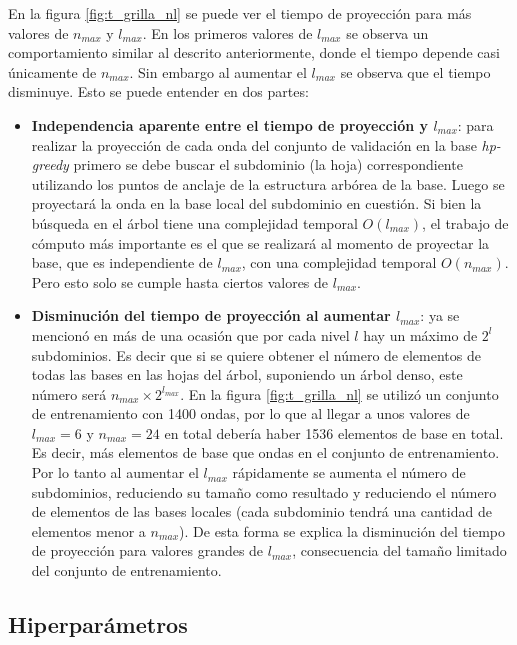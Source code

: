 En la figura \ref{fig:t_grilla_nl} se puede ver el tiempo de proyección para más valores de $n_{max}$ y $l_{max}$. En los primeros valores de $l_{max}$ se observa un comportamiento similar al descrito anteriormente, donde el tiempo depende casi únicamente de $n_{max}$. Sin embargo al aumentar el $l_{max}$ se observa que el tiempo disminuye. Esto se puede entender en dos partes:

\begin{itemize}
\item \textbf{Independencia aparente entre el tiempo de proyección y $l_{max}$}: para realizar la proyección de cada onda del conjunto de validación en la base \textit{hp-greedy} primero se debe buscar el subdominio (la hoja) correspondiente utilizando los puntos de anclaje de la estructura arbórea de la base. Luego se proyectará la onda en la base local del subdominio en cuestión. Si bien la búsqueda en el árbol tiene una complejidad temporal $O(l_{max})$, el trabajo de cómputo más importante es el que se realizará al momento de proyectar la base, que es independiente de $l_{max}$, con una complejidad temporal $O(n_{max})$. Pero esto solo se cumple hasta ciertos valores de $l_{max}$.
\item \textbf{Disminución del tiempo de proyección al aumentar $l_{max}$}: ya se mencionó en más de una ocasión que por cada nivel $l$ hay un máximo de $2^l$ subdominios. Es decir que si se quiere obtener el número de elementos de todas las bases en las hojas del árbol, suponiendo un árbol denso, este número será $n_{max} \times 2^{l_{max}}$. En la figura \ref{fig:t_grilla_nl} se utilizó un conjunto de entrenamiento con 1400 ondas, por lo que al llegar a unos valores de $l_{max} = 6$ y $n_{max} = 24$ en total debería haber 1536 elementos de base en total. Es decir, más elementos de base que ondas en el conjunto de entrenamiento. Por lo tanto al aumentar el $l_{max}$ rápidamente se aumenta el número de subdominios, reduciendo su tamaño como resultado y reduciendo el número de elementos de las bases locales (cada subdominio tendrá una cantidad de elementos menor a $n_{max}$). De esta forma se explica la disminución del tiempo de proyección para valores grandes de $l_{max}$, consecuencia del tamaño limitado del conjunto de entrenamiento.
\end{itemize}


\subsection{Hiperparámetros}

